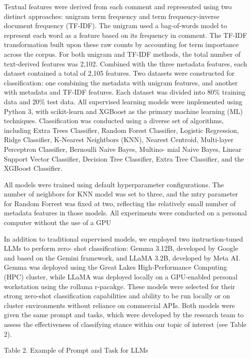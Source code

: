 \documentclass[
  12pt]{article}
\begin{document}
Textual features were derived from each comment and represented using
two distinct approaches: unigram term frequency and term
frequency-inverse document frequency (TF-IDF). The unigram used a
bag-of-words model to represent each word as a feature based on its
frequency in comment. The TF-IDF transformation built upon these raw
counts by accounting for term importance across the corpus. For both
unigram and TF-IDF methods, the total number of text-derived features
was 2,102. Combined with the three metadata features, each dataset
contained a total of 2,105 features. Two datasets were constructed for
classification: one combining the metadata with unigram features, and
another with metadata and TF-IDF features. Each dataset was divided into
80\% training data and 20\% test data. All supervised learning models
were implemented using Python 3, with scikit-learn and XGBoost as the
primary machine learning (ML) techniques. Classification was conducted
using a diverse set of algorithms, including Extra Trees Classifier,
Random Forest Classifier, Logistic Regression, Ridge Classifier,
K-Nearest Neightbors (KNN), Nearest Centroid, Multi-layer Perceptron
Classifier, Bernoulli Naive Bayes, Multino- mial Naive Bayes, Linear
Support Vector Classifier, Decision Tree Classifier, Extra Tree
Classifier, and the XGBoost Classifier.

All models were trained using default hyperparameter configurations. The
number of neighbors for KNN model was set to three, and the mtry
parameter for Random Forrest was fixed at two, reflecting the relatively
small number of metadata features in those models. All experiments were
conducted on a personal computer without the use of a GPU

In addition to traditional supervised models, we employed two
instruction-tuned LLMs to perform zero- shot classification: Gemma
3.12B, developed by Google and based on the Gemini framework, and LLaMA
3.2B, developed by Meta AI. Gemma was deployed using the Great Lakes
High-Performance Computing (HPC) cluster, while LLaMA was deployed
locally on a GPU-enabled personal workstation using the rollama
r-pacakge. These models were selected for their strong zero-shot
classification capabilities and ability to be run locally or on cluster
environments without reliance on commercial APIs. Both models were given
the same prompt and tasks, which were developed by the research team to
assess the effectiveness of classifying stance within our topic of
interest (see Table 2).

Table 2. Example of Prompt and Task for LLMs
\end{document}
